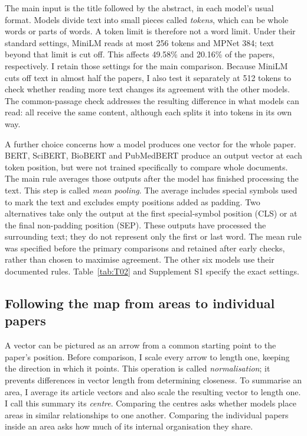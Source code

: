 \documentclass[12pt]{article}
\begin{document}
The main input is the title followed by the abstract, in each model's usual format. Models divide text into small pieces called \emph{tokens}, which can be whole words or parts of words. A token limit is therefore not a word limit. Under their standard settings, MiniLM reads at most 256 tokens and MPNet 384; text beyond that limit is cut off. This affects 49.58\% and 20.16\% of the papers, respectively. I retain those settings for the main comparison. Because MiniLM cuts off text in almost half the papers, I also test it separately at 512 tokens to check whether reading more text changes its agreement with the other models. The common-passage check addresses the resulting difference in what models can read: all receive the same content, although each splits it into tokens in its own way.

A further choice concerns how a model produces one vector for the whole paper. BERT, SciBERT, BioBERT and PubMedBERT produce an output vector at each token position, but were not trained specifically to compare whole documents. The main rule averages those outputs after the model has finished processing the text. This step is called \emph{mean pooling}. The average includes special symbols used to mark the text and excludes empty positions added as padding. Two alternatives take only the output at the first special-symbol position (CLS) or at the final non-padding position (SEP). These outputs have processed the surrounding text; they do not represent only the first or last word. The mean rule was specified before the primary comparisons and retained after early checks, rather than chosen to maximise agreement. The other six models use their documented rules. Table~\ref{tab:T02} and Supplement S1 specify the exact settings.


\subsection{Following the map from areas to individual papers}
A vector can be pictured as an arrow from a common starting point to the paper's position. Before comparison, I scale every arrow to length one, keeping the direction in which it points. This operation is called \emph{normalisation}; it prevents differences in vector length from determining closeness. To summarise an area, I average its article vectors and also scale the resulting vector to length one. I call this summary its \emph{centre}. Comparing the centres asks whether models place areas in similar relationships to one another. Comparing the individual papers inside an area asks how much of its internal organisation they share.
\end{document}
